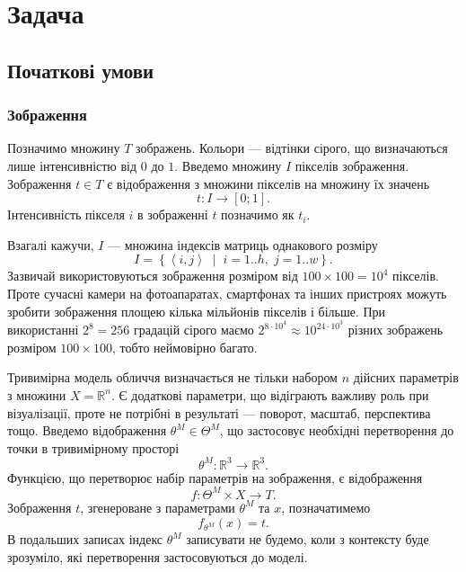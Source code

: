 \section{Задача}

\subsection{Початкові умови}

\subsubsection{Зображення}

Позначимо множину $T$ зображень.
Кольори --- відтінки сірого, що визначаються лише інтенсивністю від $0$ до $1$.
Введемо множину $I$ пікселів зображення.
Зображення $t \in T$ є відображення з множини пікселів на множину їх значень
\begin{equation*}
  t: I \rightarrow \left[ 0; 1 \right].
\end{equation*}
Інтенсивність пікселя $i$ в зображенні $t$ позначимо як $t_i$.

Взагалі кажучи, $I$ --- множина індексів матриць однакового розміру
\begin{equation*}
  I = \left\{ \left\langle i, j \right\rangle
    \;\middle|\; i = 1..h,\; j = 1..w \right\}.
\end{equation*}
Зазвичай використовуються зображення розміром від
$100 \times 100 = 10^4$ пікселів.
Проте сучасні камери на фотоапаратах, смартфонах та інших пристроях
можуть зробити зображення площею кілька мільйонів пікселів і більше.
При використанні $2^8 = 256$ градацій сірого маємо
$2^{8 \cdot 10^4} \approx 10^{24 \cdot 10^3}$
різних зображень розміром $100 \times 100$, тобто неймовірно багато.

Тривимірна модель обличчя визначається не тільки набором $n$ дійсних параметрів
з множини $X = \mathbb{R}^n$.
Є додаткові параметри, що відіграють важливу роль при візуалізації,
проте не потрібні в результаті --- поворот, масштаб, перспектива тощо.
Введемо відображення $\theta^M \in \Theta^M$,
що застосовує необхідні перетворення до точки в тривимірному просторі
\begin{equation*}
  \theta^M: \mathbb{R}^3 \rightarrow \mathbb{R}^3.
\end{equation*}
Функцією, що перетворює набір параметрів на зображення, є відображення
\begin{equation*}
  f: \Theta^M \times X \rightarrow T.
\end{equation*}
Зображення $t$, згенероване з параметрами $\theta^M$ та $x$, позначатимемо
\begin{equation*}
  f_{\theta^M} \left( x \right) = t.
\end{equation*}
В подальших записах індекс $\theta^M$ записувати не будемо,
коли з контексту буде зрозуміло, які перетворення застосовуються до моделі.

